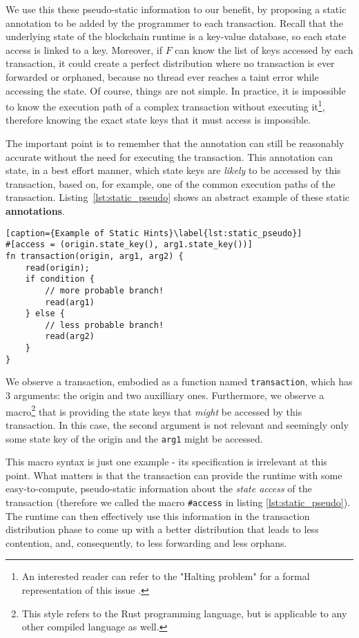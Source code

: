 We use this these pseudo-static information to our benefit, by proposing a static annotation to be added by the programmer
to each transaction. Recall that the underlying state of the blockchain runtime is a key-value
database, so each state access is linked to a key. Moreover, if $F$ can know the list of keys
accessed by each transaction, it could create a perfect distribution where no transaction is ever
forwarded or orphaned, because no thread ever reaches a taint error while accessing the state. Of
course, things are not simple. In practice, it is impossible to know the execution path of a complex
transaction without executing it\footnote{An interested reader can refer to the "Halting problem"
for a formal representation of this issue \cite{burkholderHaltingProblem1987}.}, therefore knowing
the exact state keys that it must access is impossible.

The important point is to remember that the annotation can still be reasonably accurate without the
need for executing the transaction. This annotation can state, in a best effort manner, which state
keys are \textit{likely} to be accessed by this transaction, based on, for example, one of the
common execution paths of the transaction. Listing~\ref{lst:static_pseudo} shows an abstract example of these static \textbf{annotations}.

\begin{lstlisting}[caption={Example of Static Hints}\label{lst:static_pseudo}]
#[access = (origin.state_key(), arg1.state_key())]
fn transaction(origin, arg1, arg2) {
	read(origin);
	if condition {
		// more probable branch!
		read(arg1)
	} else {
		// less probable branch!
		read(arg2)
	}
}
\end{lstlisting}

We observe a transaction, embodied as a function named \texttt{transaction}, which has 3 arguments:
the origin and two auxilliary ones. Furthermore, we observe a macro\footnote{This style refers to the
Rust programming language, but is applicable to any other compiled language as well.} that is
providing the state keys that \textit{might} be accessed by this transaction. In this case, the
second argument is not relevant and seemingly only some state key of the origin and the
\texttt{arg1} might be accessed.

This macro syntax is just one example - its specification is irrelevant at this point. What matters is that the transaction can provide the runtime with some easy-to-compute, pseudo-static
information about the \textit{state access} of the transaction (therefore we called the macro
\texttt{\#access} in listing \ref{lst:static_pseudo}). The runtime can then effectively use this
information in the transaction distribution phase to come up with a better distribution that leads
to less contention, and, consequently, to less forwarding and less orphans.

